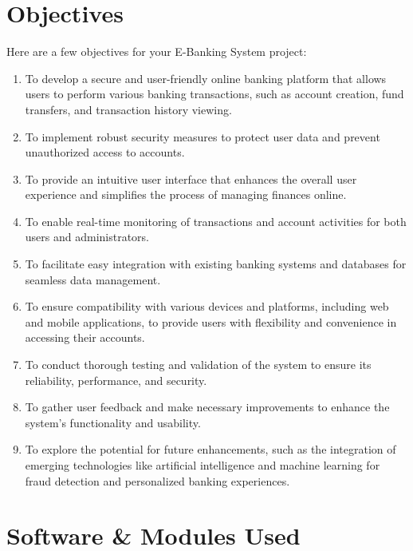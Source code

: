 \chapter{Objectives}

Here are a few objectives for your E-Banking System project:
\begin{enumerate}
    \item To develop a secure and user-friendly online banking platform that allows users to
    perform various banking transactions, such as account creation, fund transfers, and
    transaction history viewing.
    \item To implement robust security measures to protect user data and prevent unauthorized
    access to accounts.
    \item To provide an intuitive user interface that enhances the overall user experience and
    simplifies the process of managing finances online.
    \item To enable real-time monitoring of transactions and account activities for both users
    and administrators.
    \item To facilitate easy integration with existing banking systems and databases for
    seamless data management.
    \item To ensure compatibility with various devices and platforms, including web and
    mobile applications, to provide users with flexibility and convenience in accessing their
    accounts.
    \item To conduct thorough testing and validation of the system to ensure its reliability,
    performance, and security.
    \item To gather user feedback and make necessary improvements to enhance the system's
    functionality and usability.
    \item To explore the potential for future enhancements, such as the integration of
    emerging technologies like artificial intelligence and machine learning for fraud detection
    and personalized banking experiences.
\end{enumerate}


\chapter{Software \& Modules Used}

